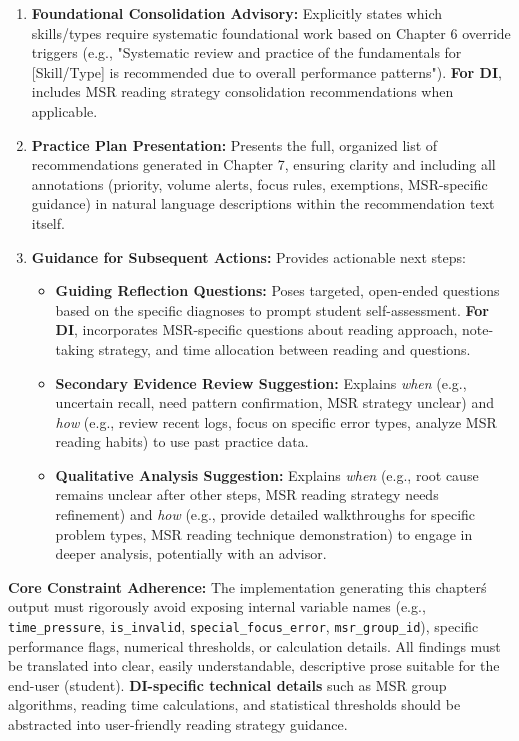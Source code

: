 \documentclass{article}
\begin{document}
\begin{enumerate}
    \item \textbf{Foundational Consolidation Advisory:} Explicitly states which skills/types require systematic foundational work based on Chapter 6 override triggers (e.g., "Systematic review and practice of the fundamentals for [Skill/Type] is recommended due to overall performance patterns"). \textbf{For DI}, includes MSR reading strategy consolidation recommendations when applicable.
    \item \textbf{Practice Plan Presentation:} Presents the full, organized list of recommendations generated in Chapter 7, ensuring clarity and including all annotations (priority, volume alerts, focus rules, exemptions, MSR-specific guidance) in natural language descriptions within the recommendation text itself.
    \item \textbf{Guidance for Subsequent Actions:} Provides actionable next steps:
    \begin{itemize}
        \item \textbf{Guiding Reflection Questions:} Poses targeted, open-ended questions based on the specific diagnoses to prompt student self-assessment. \textbf{For DI}, incorporates MSR-specific questions about reading approach, note-taking strategy, and time allocation between reading and questions.
        \item \textbf{Secondary Evidence Review Suggestion:} Explains \textit{when} (e.g., uncertain recall, need pattern confirmation, MSR strategy unclear) and \textit{how} (e.g., review recent logs, focus on specific error types, analyze MSR reading habits) to use past practice data.
        \item \textbf{Qualitative Analysis Suggestion:} Explains \textit{when} (e.g., root cause remains unclear after other steps, MSR reading strategy needs refinement) and \textit{how} (e.g., provide detailed walkthroughs for specific problem types, MSR reading technique demonstration) to engage in deeper analysis, potentially with an advisor.
    \end{itemize}
\end{enumerate}

\textbf{Core Constraint Adherence:} The implementation generating this chapter\'s output must rigorously avoid exposing internal variable names (e.g., \texttt{time\_pressure}, \texttt{is\_invalid}, \texttt{special\_focus\_error}, \texttt{msr\_group\_id}), specific performance flags, numerical thresholds, or calculation details. All findings must be translated into clear, easily understandable, descriptive prose suitable for the end-user (student). \textbf{DI-specific technical details} such as MSR group algorithms, reading time calculations, and statistical thresholds should be abstracted into user-friendly reading strategy guidance.
\end{document}
